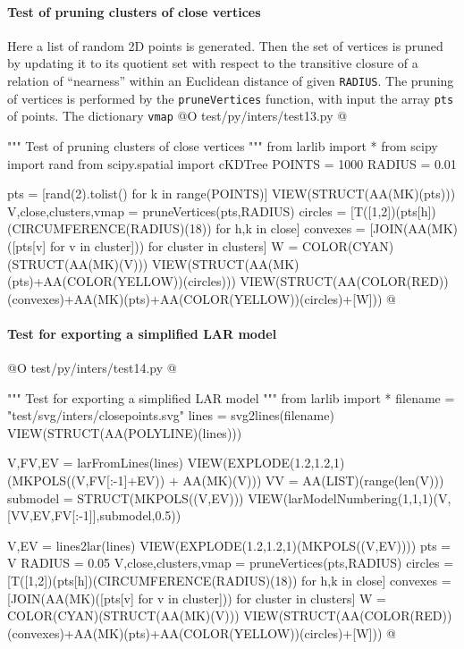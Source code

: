 \documentclass[11pt,oneside]{article}    %
\begin{document}
\paragraph{Test of pruning clusters of close vertices}
Here a list of random 2D points is generated. Then the set of vertices is pruned by updating it to its quotient set with respect to the transitive closure of a relation of ``nearness'' within an Euclidean distance of given \texttt{RADIUS}. The pruning of vertices is performed by the \texttt{pruneVertices} function, with input the array \texttt{pts} of points. The dictionary \texttt{vmap}
@O test/py/inters/test13.py
@{""" Test of pruning clusters of close vertices """
from larlib import *
from scipy import rand
from scipy.spatial import cKDTree
POINTS = 1000
RADIUS = 0.01

pts = [rand(2).tolist() for k in range(POINTS)]
VIEW(STRUCT(AA(MK)(pts)))
V,close,clusters,vmap = pruneVertices(pts,RADIUS)
circles = [T([1,2])(pts[h])(CIRCUMFERENCE(RADIUS)(18)) for h,k in close]
convexes = [JOIN(AA(MK)([pts[v] for v in cluster])) for cluster in clusters]
W = COLOR(CYAN)(STRUCT(AA(MK)(V)))
VIEW(STRUCT(AA(MK)(pts)+AA(COLOR(YELLOW))(circles)))
VIEW(STRUCT(AA(COLOR(RED))(convexes)+AA(MK)(pts)+AA(COLOR(YELLOW))(circles)+[W]))
@}


\paragraph{Test for exporting a simplified LAR model}

@O test/py/inters/test14.py
@{""" Test for exporting a simplified LAR model """
from larlib import *
filename = "test/svg/inters/closepoints.svg"
lines = svg2lines(filename)
VIEW(STRUCT(AA(POLYLINE)(lines)))

V,FV,EV = larFromLines(lines)
VIEW(EXPLODE(1.2,1.2,1)(MKPOLS((V,FV[:-1]+EV)) + AA(MK)(V)))
VV = AA(LIST)(range(len(V)))
submodel = STRUCT(MKPOLS((V,EV)))
VIEW(larModelNumbering(1,1,1)(V,[VV,EV,FV[:-1]],submodel,0.5))

V,EV = lines2lar(lines)
VIEW(EXPLODE(1.2,1.2,1)(MKPOLS((V,EV))))
pts = V
RADIUS = 0.05
V,close,clusters,vmap = pruneVertices(pts,RADIUS)
circles = [T([1,2])(pts[h])(CIRCUMFERENCE(RADIUS)(18)) for h,k in close]
convexes = [JOIN(AA(MK)([pts[v] for v in cluster])) for cluster in clusters]
W = COLOR(CYAN)(STRUCT(AA(MK)(V)))
VIEW(STRUCT(AA(COLOR(RED))(convexes)+AA(MK)(pts)+AA(COLOR(YELLOW))(circles)+[W]))
@}
\end{document}
